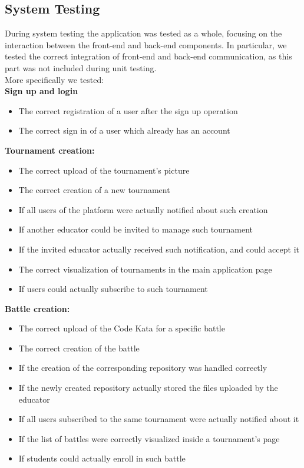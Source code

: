 \documentclass[table, 12pt]{article}
\begin{document}
\subsection{System Testing}
During system testing the application was tested as a whole, focusing on the interaction between the front-end and back-end components.
In particular, we tested the correct integration of front-end and back-end communication, as this part was not included during unit testing.\\
More specifically we tested:\\
\newline
\textbf{Sign up and login}
\begin{itemize}
    \item The correct registration of a user after the sign up operation
    \item The correct sign in of a user which already has an account
\end{itemize}
\textbf{Tournament creation:}
\begin{itemize}
    \item The correct upload of the tournament's picture
    \item The correct creation of a new tournament
    \item If all users of the platform were actually notified about such creation
    \item If another educator could be invited to manage such tournament
    \item If the invited educator actually received such notification, and could accept it
    \item The correct visualization of tournaments in the main application page
    \item If users could actually subscribe to such tournament
\end{itemize}
\textbf{Battle creation:}
\begin{itemize}
    \item The correct upload of the Code Kata for a specific battle
    \item The correct creation of the battle
    \item If the creation of the corresponding repository was handled correctly
    \item If the newly created repository actually stored the files uploaded by the educator
    \item If all users subscribed to the same tournament were actually notified about it
    \item If the list of battles were correctly visualized inside a tournament's page
    \item If students could actually enroll in such battle
\end{itemize}
\end{document}
